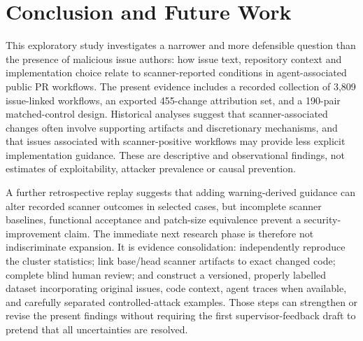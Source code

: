 \documentclass[journal,10pt,twoside]{IEEEtran}
\begin{document}
\section{Conclusion and Future Work}
This exploratory study investigates a narrower and more defensible question than the presence of malicious issue authors: how issue text, repository context and implementation choice relate to scanner-reported conditions in agent-associated public PR workflows. The present evidence includes a recorded collection of 3,809 issue-linked workflows, an exported 455-change attribution set, and a 190-pair matched-control design. Historical analyses suggest that scanner-associated changes often involve supporting artifacts and discretionary mechanisms, and that issues associated with scanner-positive workflows may provide less explicit implementation guidance. These are descriptive and observational findings, not estimates of exploitability, attacker prevalence or causal prevention.

A further retrospective replay suggests that adding warning-derived guidance can alter recorded scanner outcomes in selected cases, but incomplete scanner baselines, functional acceptance and patch-size equivalence prevent a security-improvement claim. The immediate next research phase is therefore not indiscriminate expansion. It is evidence consolidation: independently reproduce the cluster statistics; link base/head scanner artifacts to exact changed code; complete blind human review; and construct a versioned, properly labelled dataset incorporating original issues, code context, agent traces when available, and carefully separated controlled-attack examples. Those steps can strengthen or revise the present findings without requiring the first supervisor-feedback draft to pretend that all uncertainties are resolved.

\balance

\end{document}
